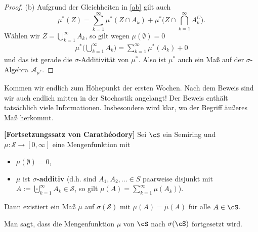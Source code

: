 \begin{proof}
	
	(b) Aufgrund der Gleichheiten in \eqref{ab} gilt auch
	 \[ \mu^{*}(Z) = \sum\limits_{k = 1}^{\infty} \mu^{*}(Z \cap A_k) + \mu^{*}\Big(Z \cap \bigcap\limits_{k = 1}^{\infty} A_k^C\Big). \] 
	Wählen wir  $	Z = \bigcup\limits_{k = 1}^{\infty} A_k$, so gilt wegen $\mu(\emptyset)=0$
	\begin{align*}
		 \mu^{*}\Big(\bigcup\limits_{k = 1}^{\infty} A_k\Big)=\sum\limits_{k = 1}^{\infty} \mu^{*}(A_k) + 0
	\end{align*}
	und das ist gerade die $\sigma$-Additivit\"at von $\mu^*$. Also ist $\mu^*$ auch ein Ma\ss{} auf der $\sigma$-Algebra $\mathcal A_{\mu^*}$.
\end{proof}
\marginpar{\textcolor{red}{Vorlesung 5}}
Kommen wir endlich zum H\"ohepunkt der ersten Wochen. Nach dem Beweis sind wir auch endlich mitten in der Stochastik angelangt! Der Beweis enth\"alt tats\"achlich viele Informationen. Insbesondere wird klar, wo der Begriff \"au\ss eres Ma\ss{} herkommt.
\begin{satz} \label{KarlTheodor}  \textbf{[Fortsetzungssatz von Carathéodory]}
	Sei $\cS$ ein Semiring und $\mu \! : \mathcal S \rightarrow [0, \infty] $ eine Mengenfunktion mit
	\begin{itemize}
		\item $\mu(\emptyset) = 0$,
		\item $\mu$ ist \textbf{$\sigma$-additiv} (d.h. sind $A_1, A_2, ... \in S$ paarweise disjunkt mit $A:=\bigcupdot_{k=1}^\infty A_k\in \mathcal S$, so gilt $\mu(A)=\sum_{k=1}^\infty \mu(A_k)$).
	\end{itemize}
	Dann existiert ein Maß $\bar{\mu}$ auf $\sigma(\mathcal S)$ mit $\mu(A) = \bar{\mu}(A)$ für alle $A \in \cS$.
\end{satz}
Man sagt, dass die Mengenfunktion $\mu$ von $\cS$ nach $\sigma(\cS)$ \glqq fortgesetzt\grqq{} wird.

